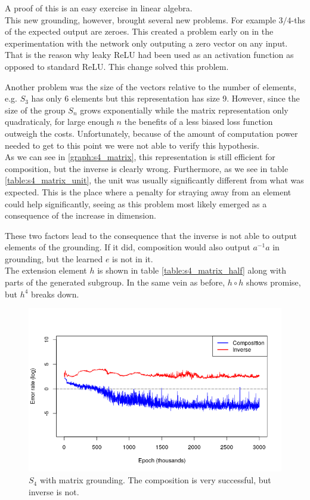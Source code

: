 A proof of this is an easy exercise in linear algebra. \\

This new grounding, however, brought several new problems. For example $3/4$-ths of the expected output are zeroes. This created a problem early on in the experimentation with the network only outputing a zero vector on any input. That is the reason why leaky ReLU had been used as an activation function as opposed to standard ReLU. This change solved this problem.

Another problem was the size of the vectors relative to the number of elements, e.g. $S_3$ has only 6 elements but this representation has size 9. However, since the size of the group $S_n$ grows exponentially while the matrix representation only quadraticaly, for large enough $n$ the benefits of a less biased loss function outweigh the costs. Unfortunately, because of the amount of computation power needed to get to this point we were not able to verify this hypothesis.\\

As we can see in \autoref{graph:s4_matrix}, this representation is still  efficient for composition, but the inverse is clearly wrong. Furthermore, as we see in table \ref{table:s4_matrix_unit}, the unit was usually significantly different from what was expected. This is the place where a penalty for straying away from an element could help significantly, seeing as this problem most likely emerged as a consequence of the increase in dimension.

These two factors lead to the consequence that the inverse is not able to output elements of the grounding. If it did, composition would also output $a^{-1}a$ in grounding, but the learned $e$ is not in it.\\

The extension element $h$ is shown in table \ref{table:s4_matrix_half} along with parts of the generated subgroup. In the same vein as before, $h\circ h$ shows promise, but $h^4$ breaks down.

\begin{figure}
\center
\caption{$S_4$ with matrix grounding. The composition is very successful, but inverse is not.}
\label{graph:s4_matrix}
\includegraphics[width=\linewidth]{../img/s4_matrix.png}
\end{figure}

